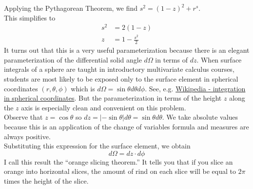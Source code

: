 Applying the Pythagorean Theorem, we find $s^2 = (1-z)^2 + r^s$. \\
This simplifies to
\begin{align*}
s^2 &= 2(1-z) \\
z &= 1 - \frac{s^2}{2}
\end{align*}
It turns out that this is a very useful parameterization because there is an elegant parameterization 
of the differential solid angle $d\Omega$ in terms of $dz$.
When surface integrals of a sphere are taught in introductory multivariate calculus courses, 
students are most likely to be exposed only to the surface element in spherical coordinates $(r, \theta, \phi)$ which is
$d\Omega = \sin \theta d\theta d\phi$.
See, e.g. \href{https://en.wikipedia.org/wiki/Spherical_coordinate_system}{Wikipedia - integration in spherical coordinates}.
But the parameterization in terms of the height $z$ along the $z$ axis is especially clean and convenient on this problem.\\
Observe that $z = \cos \theta$ so $dz = |- \sin \theta| d\theta = \sin \theta d\theta$.  
We take absolute values because this is an application of the change of variables formula and measures are always positive. \\
Substituting this expression for the surface element, we obtain
$$ d\Omega = dz \cdot d\phi$$
I call this result the ``orange slicing theorem.''
It tells you that if you slice an orange into horizontal slices, the amount of rind on each slice will be equal to $2 \pi$ times the height of the slice.

